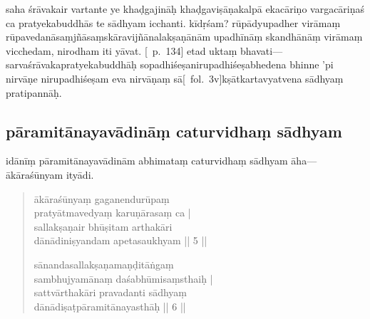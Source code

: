 \documentclass[12pt]{article}
\newcommand{\emdash} {\hspace{0em}—\hspace{0em}}
\begin{document}
saha śrāvakair vartante ye khaḍgajināḥ khaḍgaviṣāṇakalpā ekacāriṇo vargacāriṇaś\footnoteB{
	vargacāriṇaś] \MS\ (\emph{cf.\ Abhidharmakośabhāṣya}); vanacāriṇaś \EDD 
} ca pratyekabuddhās te sādhyam icchanti.
kīdṛśam?
rūpādyupadher virāmaṃ rūpavedanāsaṃjñāsaṃskāravijñānalakṣaṇānām upadhīnāṃ skandhānāṃ virāmaṃ vicchedam, nirodham iti yāvat.
[\EDD\ p.\ 134] etad uktaṃ bhavati\emdash sarvaśrāvakapratyekabuddhāḥ sopadhiśeṣanirupadhiśeṣabhedena bhinne 'pi nirvāṇe\footnoteB{
	nirvāṇe] \EDD ; nirvāṇa° \MS
} nirupadhiśeṣam eva nirvāṇaṃ sā[\MS\ fol.\ 3v]kṣātkartavyatvena sādhyaṃ pratipannāḥ.

\subsection{pāramitānayavādināṃ caturvidhaṃ sādhyam}
idānīṃ pāramitānayavādinām abhimataṃ\footnoteB{
	abhimataṃ] \EDD; abhimata \MS
} caturvidhaṃ sādhyam āha\emdash ākāraśūnyam ityādi.

\begin{quote}
	ākāraśūnyaṃ gaganendurūpaṃ \\
	pratyātmavedyaṃ karuṇārasaṃ ca |\\
	sallakṣaṇair bhūṣitam\footnoteB{
		bhūṣitam] \EDD ; bhuṣitam \MS
	} arthakāri \\
	dānādiniṣyandam apetasaukhyam || 5 ||
 
	sānandasallakṣaṇamaṇḍitāṅgaṃ \\
	sambhujyamānaṃ daśabhūmisaṃsthaiḥ |\\
	sattvārthakāri pravadanti sādhyaṃ \\
	dānādiṣaṭpāramitānayasthāḥ || 6 ||

\end{quote}
\end{document}
